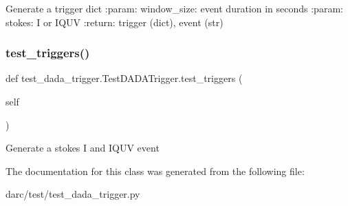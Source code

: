 \begin{DoxyVerb}Generate a trigger dict
:param: window_size: event duration in seconds
:param: stokes: I or IQUV
:return: trigger (dict), event (str)
\end{DoxyVerb}
 \mbox{\label{classtest__dada__trigger_1_1_test_d_a_d_a_trigger_a39479211c9da337e2983427d09d29c3f}} 
\subsubsection{\texorpdfstring{test\_triggers()}{test\_triggers()}}
{\footnotesize\ttfamily def test\+\_\+dada\+\_\+trigger.\+Test\+D\+A\+D\+A\+Trigger.\+test\+\_\+triggers (\begin{DoxyParamCaption}\item[{}]{self }\end{DoxyParamCaption})}

\begin{DoxyVerb}Generate a stokes I and IQUV event
\end{DoxyVerb}
 

The documentation for this class was generated from the following file\+:\begin{DoxyCompactItemize}
\item 
darc/test/test\+\_\+dada\+\_\+trigger.\+py\end{DoxyCompactItemize}
